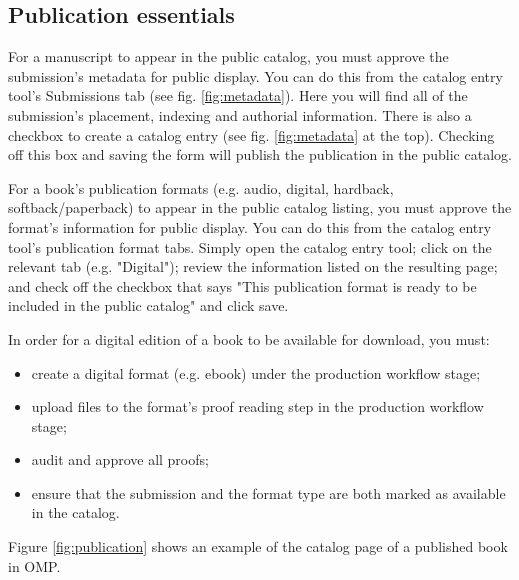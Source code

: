 \subsection*{Publication essentials}

For a manuscript to appear in the public catalog, you must approve the submission's metadata for public display. You can do this from the catalog entry tool's Submissions tab (see fig. \ref{fig:metadata}). Here you will find all of the submission's placement, indexing and authorial information. There is also a checkbox to create a catalog entry (see fig. \ref{fig:metadata} at the top). Checking off this box and saving the form will publish the publication in the public catalog.

For a book's publication formats (e.g. audio, digital, hardback, softback/paperback) to appear in the public catalog listing, you must approve the format's information for public display. You can do this from the catalog entry tool's publication format tabs. Simply open the catalog entry tool; click on the relevant tab (e.g. "Digital"); review the information listed on the resulting page; and check off the checkbox that says "This publication format is ready to be included in the public catalog" and click save.

In order for a digital edition of a book to be available for download, you must:
\begin{itemize}[noitemsep]
\item create a digital format (e.g. ebook) under the production workflow stage;
\item upload files to the format's proof reading step in the production workflow stage;
\item audit and approve all proofs;
\item ensure that the submission and the format type are both marked as available in the catalog.
\end{itemize}


Figure \ref{fig:publication} shows an example of the catalog page of a published book in OMP.


